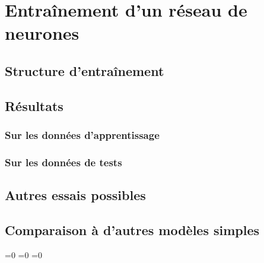 \documentclass[11pt,a4paper]{article}
\begin{document}
\section{Entraînement d'un réseau de neurones}
\subsection{Structure d'entraînement}
\subsection{Résultats}
\subsubsection{Sur les données d'apprentissage}
\subsubsection{Sur les données de tests}
\subsection{Autres essais possibles}
\subsection{Comparaison à d'autres modèles simples}

\setcounter{section}{0}


%
%
%
%


\makeatletter
\ifnum{}=0
\clearpage
\else\ifnum{}=0
\clearpage
\else\ifnum{}=0
\clearpage
\fi\fi\fi

\renewcommand{\sectionbreak}{}
\end{document}
